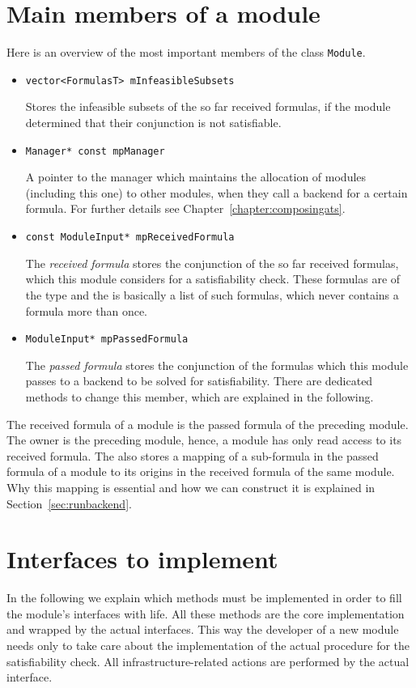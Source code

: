 \section{Main members of a module}
Here is an overview of the most important members of the class \texttt{Module}.
\begin{itemize}
	\item \begin{verbatim}vector<FormulasT> mInfeasibleSubsets\end{verbatim}
		Stores the infeasible subsets of the so far received formulas, if the module determined that
		their conjunction is not satisfiable.
	\item \begin{verbatim}Manager* const mpManager\end{verbatim}
		A pointer to the manager which maintains the allocation of modules (including this one) to other 
		modules, when they call a backend for a certain formula. For further details see Chapter~\ref{chapter:composingats}.
	\item \begin{verbatim}const ModuleInput* mpReceivedFormula\end{verbatim}
		The \emph{received formula} stores the conjunction of the so far received formulas, which this module considers
		for a satisfiability check. These formulas are of the type \formulaClass and the \moduleInputClass
		is basically a list of such formulas, which never contains a formula more than once.
	\item \begin{verbatim}ModuleInput* mpPassedFormula\end{verbatim}
		The \emph{passed formula} stores the conjunction of the formulas which this module passes to a backend to be
		solved for satisfiability. There are dedicated methods to change this member, which are explained in the following.
\end{itemize}
The received formula of a module is the passed formula of the preceding module. The owner is the preceding module, hence, a module has only read access to its received formula. The \moduleInputClass also stores a mapping of
a sub-formula in the passed formula of a module to its origins in the received formula of the same module. Why this mapping
is essential and how we can construct it is explained in Section~\ref{sec:runbackend}.

\section{Interfaces to implement}
In the following we explain which methods must be implemented in order to fill the module's interfaces with life. All these methods are the core implementation and wrapped by the actual interfaces. This way the developer of a new module needs only to take care about the implementation of the actual procedure for the satisfiability check. All infrastructure-related actions are performed by the actual interface.

